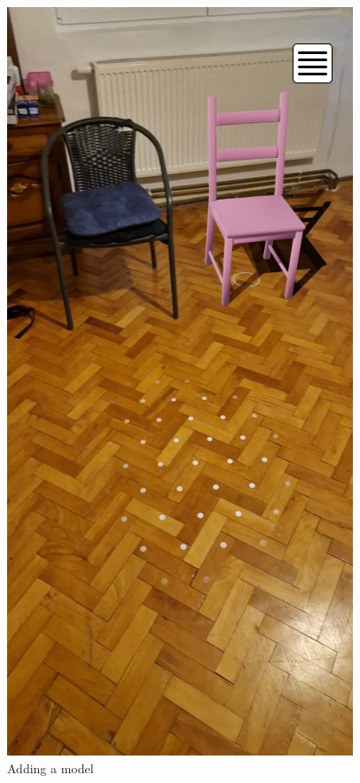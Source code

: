 \begin{figure}[!h]
    \begin{center}
        \includegraphics[scale=0.5]{img/App_mock/iPhone 14 - 6.png}
        \caption{Adding a model}
        \label{fig:add-a-model}
    \end{center}
\end{figure}
\pagebreak


